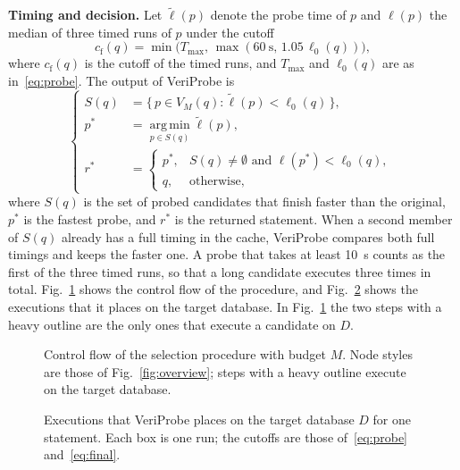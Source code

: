 \documentclass[conference]{IEEEtran}
\newcommand{\sys}{VeriProbe}
\begin{document}
\textbf{Timing and decision.}
Let $\tilde{\ell}(p)$ denote the probe time of $p$ and $\ell(p)$ the median of three timed runs of $p$ under the cutoff
\begin{equation}
c_{\mathrm{f}}(q) = \min\bigl(T_{\max},\, \max(\SI{60}{\second},\, 1.05\,\ell_{0}(q))\bigr),
\label{eq:final}
\end{equation}
where $c_{\mathrm{f}}(q)$ is the cutoff of the timed runs, and $T_{\max}$ and $\ell_{0}(q)$ are as in~\eqref{eq:probe}.
The output of \sys{} is
\begin{equation}
\left\{
\begin{aligned}
S(q) &= \{\, p \in V_{M}(q) : \tilde{\ell}(p) < \ell_{0}(q) \,\},\\
p^{\ast} &= \operatorname*{arg\,min}_{p \in S(q)} \tilde{\ell}(p),\\
r^{\ast} &=
  \begin{cases}
    p^{\ast}, & S(q) \neq \emptyset \text{ and } \ell(p^{\ast}) < \ell_{0}(q),\\
    q, & \text{otherwise},
  \end{cases}
\end{aligned}
\right.
\label{eq:decision}
\end{equation}
where $S(q)$ is the set of probed candidates that finish faster than the original, $p^{\ast}$ is the fastest probe, and $r^{\ast}$ is the returned statement.
When a second member of $S(q)$ already has a full timing in the cache, \sys{} compares both full timings and keeps the faster one.
A probe that takes at least \SI{10}{\second} counts as the first of the three timed runs, so that a long candidate executes three times in total.
Fig.~\ref{fig:selection} shows the control flow of the procedure, and Fig.~\ref{fig:timeline} shows the executions that it places on the target database.
In Fig.~\ref{fig:selection} the two steps with a heavy outline are the only ones that execute a candidate on $D$.

\begin{figure}[t]
  \centering
  
  \caption{Control flow of the selection procedure with budget $M$. Node styles are those of Fig.~\ref{fig:overview}; steps with a heavy outline execute on the target database.}
  \label{fig:selection}
\end{figure}

\begin{figure}[t]
  \centering
  
  \caption{Executions that \sys{} places on the target database $D$ for one statement. Each box is one run; the cutoffs are those of~\eqref{eq:probe} and~\eqref{eq:final}.}
  \label{fig:timeline}
\end{figure}
\end{document}
